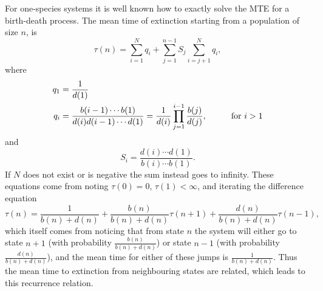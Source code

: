 For one-species systems it is well known how to exactly solve the MTE for a birth-death process. 
The mean time of extinction starting from a population of size $n$, is \cite{Nisbet1982,Palamara2013}
\begin{equation}
\tau(n) = \sum_{i=1}^{N}q_i + \sum_{j=1}^{n-1} S_j\sum_{i=j+1}^{N}q_i,
\label{analytic_mte}
\end{equation}
where
\begin{align}
q_1 &= \frac{1}{d(1)} \\
q_i &= \frac{b(i-1)\cdots b(1)}{d(i)d(i-1)\cdots d(1)} = \frac{1}{d(i)}\prod_{j=1}^{i-1}\frac{b(j)}{d(j)}, \hspace{1cm} \text{for }i > 1 \notag
\end{align}
and
\begin{equation}
S_i = \frac{d(i)\cdots d(1)}{b(i)\cdots b(1)}.  
\end{equation}
If $N$ does not exist or is negative the sum instead goes to infinity. 
These equations come from noting $\tau(0)=0$, $\tau(1)<\infty$, and iterating the difference equation \cite{Nisbet1982,Palamara2013}
\begin{equation}
\tau(n) = \frac{1}{b(n)+d(n)} 
+ \frac{b(n)}{b(n)+d(n)}\tau(n+1) 
+ \frac{d(n)}{b(n)+d(n)}\tau(n-1),
 \label{mte-recurrence}
\end{equation}
which itself comes from noticing that from state $n$ the system will either go to state $n+1$ (with probability $\frac{b(n)}{b(n)+d(n)}$) or state $n-1$ (with probability $\frac{d(n)}{b(n)+d(n)}$), and the mean time for either of these jumps is $\frac{1}{b(n)+d(n)}$. 
Thus the mean time to extinction from neighbouring states are related, which leads to this recurrence relation. 

